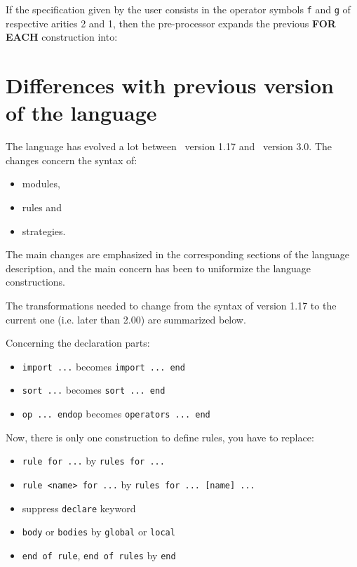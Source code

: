 If the specification given by the user consists in the operator symbols
{\tt f} and {\tt g} of respective arities 2 and 1, then the
pre-processor expands the previous {\bf FOR EACH} construction into:\\

\FEX


\section{Differences with previous version of the language}
\label{versionChanges}

The language has evolved a lot between \elan\ version 1.17 and \elan\
version 3.0. The changes concern the syntax of:
\begin{itemize}
  \item modules,
  \item rules and
  \item strategies.
\end{itemize}

The main changes are emphasized in the corresponding sections of the
language description, and the main concern has been to uniformize the
language constructions.

The transformations needed to change from the syntax of version 1.17 to the
current one (i.e. later than 2.00) are summarized below.

Concerning the declaration parts:
\begin{itemize}
\item \texttt{import ...} becomes \texttt{import ... end}
\item \texttt{sort ...} becomes \texttt{sort ... end}
\item \texttt{op ... endop} becomes \texttt{operators ... end}
\end{itemize}
Now, there is only one construction to define rules, you have to
replace: 
\begin{itemize}
\item \texttt{rule for ...} by \texttt{rules for ...}
\item \texttt{rule <name> for ...} by \texttt{rules for ... [name] ...}
\item suppress \texttt{declare} keyword
\item \texttt{body} or \texttt{bodies} by \texttt{global} or
  \texttt{local}
\item \texttt{end of rule}, \texttt{end of rules} by \texttt{end}
\end{itemize}

